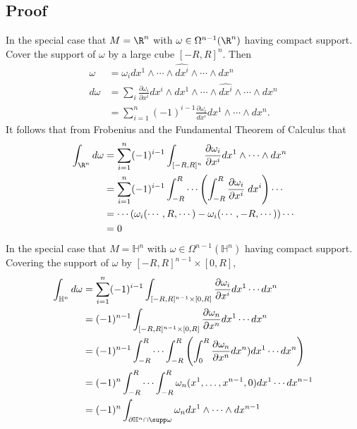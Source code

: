 \documentclass[11pt]{article}
\begin{document}
\subsection*{Proof}
\label{sec:org1b05b69}
In the special case that \(M=\R^{n}\) with \(\omega\in\Omega^{n-1}(\R^{n})\) having compact support.\\
Cover the support of \(\omega\) by a large cube \([-R,R]^{n}\). Then\\
\begin{align*}
  \omega
  &=\omega_{i}dx^{1}\wedge\cdots\wedge\widehat{dx^{i}}\wedge\cdots\wedge dx^{n} \\
  d\omega
  &=\sum_{i}\frac{\partial\omega_{i}}{\partial x^{i}}dx^{i}\wedge dx^{1}\wedge\cdots\wedge\widehat{dx^{i}}\wedge\cdots\wedge dx^{n} \\
  &=\sum_{i=1}^{n}(-1)^{i-1}\frac{\partial\omega_{i}}{dx^{i}}dx^{1}\wedge\cdots\wedge dx^{n}.
\end{align*}
It follows that from Frobenius and the Fundamental Theorem of Calculus that\\
\begin{align*}
  \int_{\R^{n}}d\omega
  &=\sum_{i=1}^{n}(-1)^{i-1}\int_{[-R,R]^{n}}\frac{\partial\omega_{i}}{\partial x^{i}}dx^{1}\wedge\cdots\wedge dx^{n} \\
  &=\sum_{i=1}^{n}(-1)^{i-1}\int_{-R}^{R}\cdots \left( \int_{-R}^{R}\frac{\partial\omega_{i}}{\partial x^{i}}\;dx^{i} \right)\cdots \\
  &=\cdots\left( \omega_{i}(\cdots,R,\cdots)-\omega_{i}(\cdots,-R,\cdots) \right) \cdots \\
  &=0
\end{align*}
In the special case that \(M=\mathbb{H}^{n}\) with \(\omega\in\Omega^{n-1}(\mathbb{H}^{n})\) having compact support.\\
Covering the support of \(\omega\) by \([-R,R]^{n-1}\times[0,R]\),\\
\begin{align*}
  \int_{\mathbb{H}^{n}}d\omega
  &=\sum_{i=1}^{n}(-1)^{i-1}\int_{[-R,R]^{n-1}\times[0,R]}\frac{\partial\omega_{i}}{\partial x^{i}}dx^{1}\cdots dx^{n} \\
  &=(-1)^{n-1}\int_{[-R,R]^{n-1}\times[0,R]}\frac{\partial\omega_{n}}{\partial x^{n}}dx^{1}\cdots dx^{n} \\
  &=(-1)^{n-1}\int_{-R}^{R}\cdots\int_{-R}^{R}\left( \int_{0}^{R}\frac{\partial\omega_{n}}{\partial x^{n}}dx^{n})dx^{1}\cdots dx^{n} \right) \\
  &=(-1)^{n}\int_{-R}^{R}\cdots\int_{-R}^{R}\omega_{n}(x^{1},\ldots,x^{n-1},0)dx^{1}\cdots dx^{n-1} \\
  &=(-1)^{n}\int_{\partial\mathbb{H}^{n}\cap\supp\omega}\omega_{n}dx^{1}\wedge\cdots\wedge dx^{n-1}
\end{align*}
\end{document}
